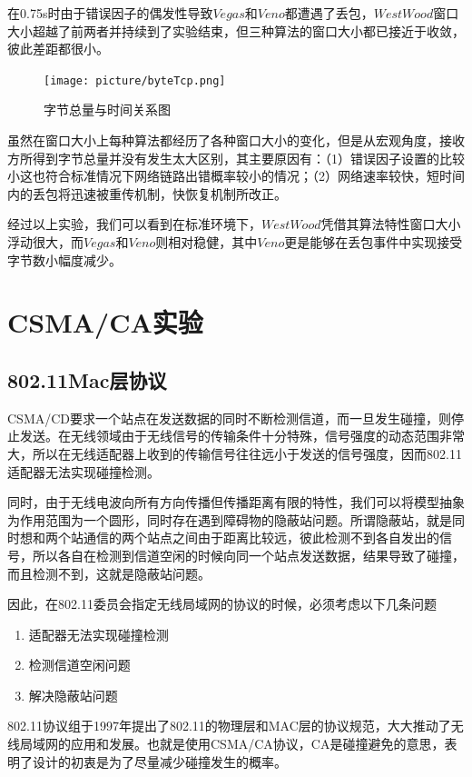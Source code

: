 \documentclass{article}
\begin{document}
在0.75s时由于错误因子的偶发性导致$Vegas$和$Veno$都遭遇了丢包，$WestWood$窗口大小超越了前两者并持续到了实验结束，但三种算法的窗口大小都已接近于收敛，彼此差距都很小。

\begin{figure}[H]
	\centering
	\texttt{[image: picture/byteTcp.png]}
	\caption{字节总量与时间关系图}
	\label{fig:byteTCP}
\end{figure}

虽然在窗口大小上每种算法都经历了各种窗口大小的变化，但是从宏观角度，接收方所得到字节总量并没有发生太大区别，其主要原因有：（1）错误因子设置的比较小这也符合标准情况下网络链路出错概率较小的情况；（2）网络速率较快，短时间内的丢包将迅速被重传机制，快恢复机制所改正。

经过以上实验，我们可以看到在标准环境下，$WestWood$凭借其算法特性窗口大小浮动很大，而$Vegas$和$Veno$则相对稳健，其中$Veno$更是能够在丢包事件中实现接受字节数小幅度减少。

\section{CSMA/CA实验}
\subsection{802.11Mac层协议}

CSMA/CD要求一个站点在发送数据的同时不断检测信道，而一旦发生碰撞，则停止发送。在无线领域由于无线信号的传输条件十分特殊，信号强度的动态范围非常大，所以在无线适配器上收到的传输信号往往远小于发送的信号强度，因而802.11适配器无法实现碰撞检测。

同时，由于无线电波向所有方向传播但传播距离有限的特性，我们可以将模型抽象为作用范围为一个圆形，同时存在遇到障碍物的隐蔽站问题。所谓隐蔽站，就是同时想和两个站通信的两个站点之间由于距离比较远，彼此检测不到各自发出的信号，所以各自在检测到信道空闲的时候向同一个站点发送数据，结果导致了碰撞，而且检测不到，这就是隐蔽站问题。

因此，在802.11委员会指定无线局域网的协议的时候，必须考虑以下几条问题

\begin{enumerate}
	
	\item {适配器无法实现碰撞检测}
	\item {检测信道空闲问题}
	\item {解决隐蔽站问题}
	
\end{enumerate}

802.11协议组于1997年提出了802.11的物理层和MAC层的协议规范，大大推动了无线局域网的应用和发展。也就是使用CSMA/CA协议，CA是碰撞避免的意思，表明了设计的初衷是为了尽量减少碰撞发生的概率。
\end{document}
